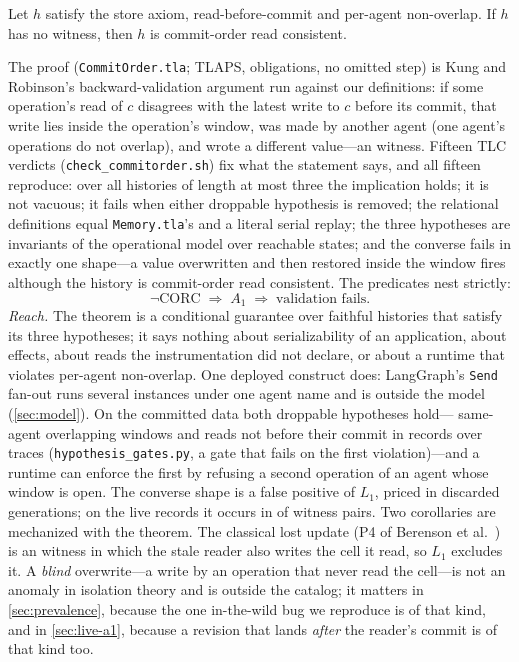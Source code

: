 \begin{theorem}
\label{thm:corc}
Let $h$ satisfy the store axiom, read-before-commit and per-agent non-overlap.
If $h$ has no  witness, then $h$ is commit-order read consistent.
\end{theorem}

The proof (\texttt{CommitOrder.tla}; TLAPS, \TlapsCommitOrder{} obligations,
no omitted step) is Kung and Robinson's backward-validation argument run
against our definitions: if some operation's read of $c$ disagrees with the
latest write to $c$ before its commit, that write lies inside the operation's
window, was made by another agent (one agent's operations do not overlap), and
wrote a different value---an  witness. Fifteen TLC verdicts
(\texttt{check\_commitorder.sh}) fix what the statement says, and all fifteen
reproduce: over all \CommitOrderHistories{} histories of length at most three
the implication holds; it is not vacuous; it fails when either droppable
hypothesis is removed; the relational definitions equal
\texttt{Memory.tla}'s and a literal serial replay; the three hypotheses are
invariants of the operational model over \CommitOrderMemoryStates{} reachable
states; and the converse fails in exactly one shape---a value overwritten and
then restored inside the window fires  although the history is
commit-order read consistent. The predicates nest strictly:
\[
  \neg\text{CORC} \;\Longrightarrow\; A_1 \;\Longrightarrow\; \text{validation fails}.
\]
\emph{Reach.} The theorem is a conditional guarantee over faithful histories
that satisfy its three hypotheses; it says nothing about serializability of
an application, about effects, about reads the instrumentation did not
declare, or about a runtime that violates per-agent non-overlap. One deployed
construct does: LangGraph's \texttt{Send} fan-out runs several instances
under one agent name and is outside the model (\cref{sec:model}). On the
committed data both droppable hypotheses hold---\HypSameAgentOverlaps{}
same-agent overlapping windows and \HypReadBeforeCommitViolations{} reads
not before their commit in \HypRecords{} records over \HypTraces{} traces
(\texttt{hypothesis\_gates.py}, a gate that fails on the first
violation)---and a runtime can enforce the first by refusing a second
operation of an agent whose window is open. The converse shape is a false positive of $L_1$, priced in
discarded generations; on the live records it occurs in \HypRestored{} of
\HypAOneWitnesses{}  witness pairs.
Two corollaries are mechanized with the theorem. The classical lost update
(P4 of Berenson et al.~\cite{BerensonEtAl1995}) is an  witness in which
the stale reader also writes the cell it read, so $L_1$ excludes it. A
\emph{blind} overwrite---a write by an operation that never read the cell---is
not an anomaly in isolation theory and is outside the catalog; it matters in
\cref{sec:prevalence}, because the one in-the-wild bug we reproduce is of that
kind, and in \cref{sec:live-a1}, because a revision that lands \emph{after}
the reader's commit is of that kind too.

